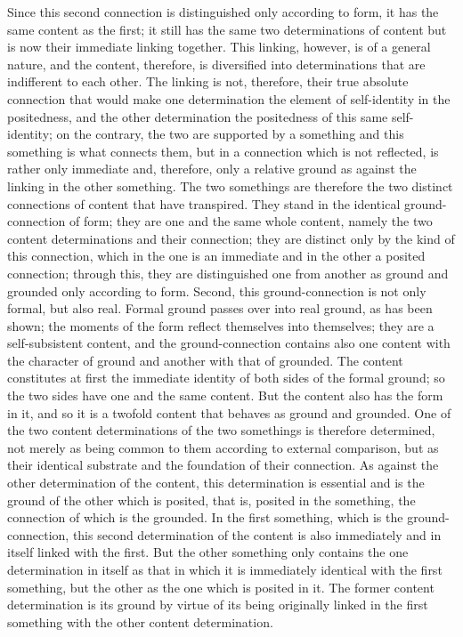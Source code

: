Since this second connection is
distinguished only according to form,
it has the same content as the first;
it still has the same two determinations of content
but is now their immediate linking together.
This linking, however, is of a general nature,
and the content, therefore, is diversified into determinations
that are indifferent to each other.
The linking is not, therefore, their true absolute connection
that would make one determination the element of
self-identity in the positedness,
and the other determination
the positedness of this same self-identity;
on the contrary, the two are supported by a something
and this something is what connects them,
but in a connection which is not reflected,
is rather only immediate and, therefore,
only a relative ground as against
the linking in the other something.
The two somethings are therefore the two distinct
connections of content that have transpired.
They stand in the identical ground-connection of form;
they are one and the same whole content,
namely the two content determinations and their connection;
they are distinct only by the kind of this connection,
which in the one is an immediate
and in the other a posited connection;
through this, they are distinguished
one from another as ground and grounded only according to form.
Second, this ground-connection is not only formal, but also real.
Formal ground passes over into real ground, as has been shown;
the moments of the form reflect themselves into themselves;
they are a self-subsistent content,
and the ground-connection contains
also one content with the character of ground
and another with that of grounded.
The content constitutes at first the immediate
identity of both sides of the formal ground;
so the two sides have one and the same content.
But the content also has the form in it,
and so it is a twofold content 
that behaves as ground and grounded.
One of the two content determinations of
the two somethings is therefore determined,
not merely as being common to them
according to external comparison,
but as their identical substrate
and the foundation of their connection.
As against the other determination of the content,
this determination is essential
and is the ground of the other which is posited,
that is, posited in the something,
the connection of which is the grounded.
In the first something, which is the ground-connection,
this second determination of the content is
also immediately and in itself linked with the first.
But the other something only contains
the one determination in itself as that
in which it is immediately identical with the first something,
but the other as the one which is posited in it.
The former content determination is its
ground by virtue of its being originally linked
in the first something with
the other content determination.

